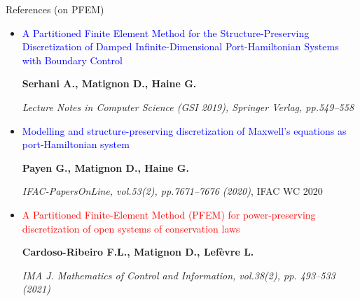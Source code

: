 \documentclass[10pt,aspectratio=43]{ISAE-Beamer}
\newcommand{\blue}[1]{\textcolor{blue}{#1}}
\newcommand{\red}[1]{\textcolor{red}{#1}}
\newcommand{\biblio}{\blue{\tiny\faBook}}
\begin{document}
\begin{frame}{References (on PFEM)}
{\begin{itemize}
\textbf{Serhani A., Haine G., Matignon D.}

\textit{IFAC-PapersOnLine, vol.52(7), pp.57--62 (2019)}, TFMST 2019
\vfill
\item[\biblio] \blue{A Partitioned Finite Element Method for the Structure-Preserving Discretization of Damped Infinite-Dimensional Port-Hamiltonian Systems with Boundary Control}

\textbf{Serhani A., Matignon D., Haine G.}

\textit{Lecture Notes in Computer Science (GSI 2019), Springer Verlag,  pp.549--558}
\vfill
\item[\biblio] \blue{Modelling and structure-preserving discretization of Maxwell’s equations as port-Hamiltonian system}

\textbf{Payen G.,  Matignon D., Haine G.}

\textit{IFAC-PapersOnLine, vol.53(2), pp.7671--7676 (2020)}, IFAC WC 2020
\vfill
\item[\biblio] \red{A Partitioned Finite-Element Method (PFEM) for power-preserving discretization of open systems of conservation laws}

\textbf{Cardoso-Ribeiro F.L., Matignon D., Lef\`evre L.}

\textit{IMA J. Mathematics of Control and Information, vol.38(2), pp. 493--533 (2021)}


\end{itemize}}
\end{frame}
\end{document}
